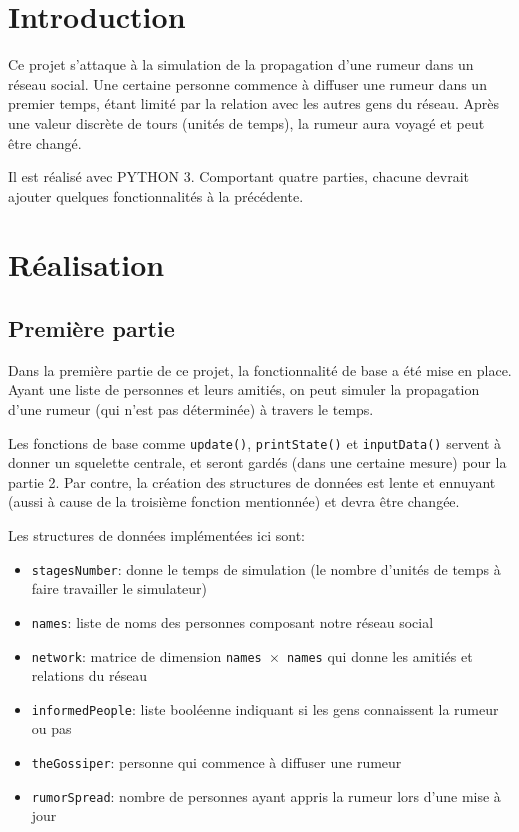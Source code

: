 \documentclass[11pt,a4paper]{article}
\begin{document}
    
    \pagestyle{empty}
\tableofcontents
\newpage
\pagestyle{fancy}
\setcounter{page}{1}

\section{Introduction}

Ce projet s'attaque à la simulation de la propagation d'une rumeur dans un
réseau social. Une certaine personne commence à diffuser une rumeur dans un
premier temps, étant limité par la relation avec les autres gens du
réseau. Après une valeur discrète de tours (unités de temps), la rumeur aura
voyagé et peut être changé.


Il est réalisé avec \textsc{\footnotesize{PYTHON 3}}. Comportant
quatre parties, chacune devrait ajouter quelques fonctionnalités à la
précédente.


\section{Réalisation}

\subsection{Première partie}

Dans la première partie de ce projet, la fonctionnalité de base a été mise en
place. Ayant une liste de personnes et leurs amitiés, on peut simuler la
propagation d'une rumeur (qui n'est pas déterminée) à travers le temps.

Les fonctions de base comme \texttt{update()}, \texttt{printState()} et
\texttt{inputData()} servent à donner un squelette centrale, et seront gardés
(dans une certaine mesure) pour la partie 2. Par contre, la création des
structures de données est lente et ennuyant (aussi à cause de la troisième
fonction mentionnée) et devra être changée.

Les structures de données implémentées ici sont:

\begin{itemize}
\item \texttt{stagesNumber}: donne le temps de simulation (le nombre d'unités de
  temps à faire travailler le simulateur)
\item \texttt{names}: liste de noms des personnes composant notre réseau social
\item \texttt{network}: matrice de dimension \texttt{names \(\times\) names} qui donne les amitiés et relations du réseau
\item \texttt{informedPeople}: liste booléenne indiquant si les gens connaissent la rumeur ou pas
\item \texttt{theGossiper}: personne qui commence à diffuser une rumeur
\item \texttt{rumorSpread}: nombre de personnes ayant appris la rumeur lors
  d'une mise à jour
\texttt{}
\end{itemize}
\end{document}
